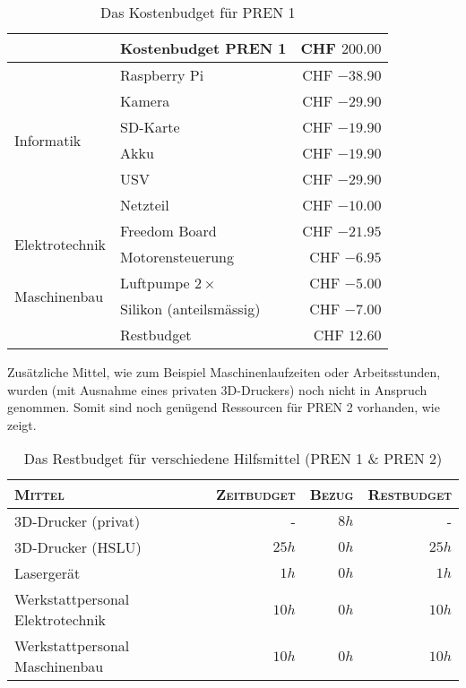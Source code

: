 \begin{table}
    \centering
    \begin{tabularx}{0.8\textwidth}{l|X|r}
    & Kostenbudget PREN 1 & CHF $200.00$ \\
    \hline
    \multirow{6}{*}{Informatik} & Raspberry Pi & CHF $-38.90$ \\
    & Kamera & CHF $-29.90$ \\
    & SD-Karte & CHF $-19.90$ \\
    & Akku & CHF $-19.90$ \\
    & USV & CHF $-29.90$ \\
    & Netzteil & CHF $-10.00$ \\
    \hline
    \multirow{2}{*}{Elektrotechnik} & Freedom Board & CHF $-21.95$ \\
    & Motorensteuerung & CHF $-6.95$ \\
    \hline
    \multirow{2}{*}{Maschinenbau} & Luftpumpe $2\times$ & CHF $-5.00$ \\
    & Silikon (anteilsmässig) & CHF $-7.00$ \\
    \hline
    & Restbudget & CHF $12.60$ \\
    \end{tabularx}
    \caption{Das Kostenbudget für PREN 1\label{tbl:kostenbudget-pren1}}
\end{table}

Zusätzliche Mittel, wie zum Beispiel Maschinenlaufzeiten oder Arbeitsstunden, wurden (mit Ausnahme eines privaten 3D-Druckers) noch nicht in Anspruch genommen. Somit sind noch genügend Ressourcen für PREN 2 vorhanden, wie  zeigt.

\begin{table}
    \centering
    \begin{tabularx}{0.85\textwidth}{X|r|r|r}
    \textsc{Mittel} & \textsc{Zeitbudget} & \textsc{Bezug} & \textsc{Restbudget} \\ \hline
    3D-Drucker (privat) & - & $8h$ & - \\ \hline
    3D-Drucker (HSLU) & $25h$ & $0h$ & $25h$ \\ \hline
    Lasergerät & $1h$ & $0h$ & $1h$ \\ \hline
    Werkstattpersonal Elektrotechnik & $10h$ & $0h$ & $10h$ \\ \hline
    Werkstattpersonal Maschinenbau & $10h$ & $0h$ & $10h$
    \end{tabularx}
    \caption{Das Restbudget für verschiedene Hilfsmittel (PREN 1 \& PREN 2)\label{tbl:restbudget}}
\end{table}
